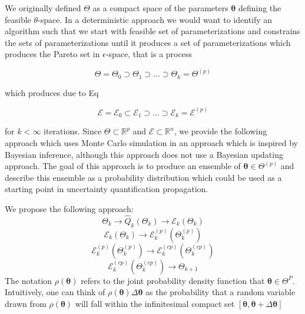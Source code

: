 We originally defined $\Theta$ as a compact space of the parameters ${\bm{\theta}}$ defining the feasible $\theta$-space.  In a deterministic approach we would want to identify an algorithm such that we start with feasible set of parameterizations and constrains the sets of parameterizations until it produces a set of parameterizations which produces the Pareto set in $\epsilon$-space, that is a process

\begin{equation}
    \Theta = \Theta_0 \supset \Theta_1 \supset \hdots \supset \Theta_k = \Theta^{(p)}
\end{equation}

which produces due to Eq %

\begin{equation}
    \mathcal{E} = \mathcal{E}_0 \subset \mathcal{E}_1 \supset \hdots \supset \mathcal{E}_k = \mathcal{E}^{(p)}
\end{equation}

for $k < \infty$ iterations.  Since $\Theta \subset \mathbb{R}^p$ and $\mathcal{E} \subset \mathbb{R}^n$, we provide the following approach which uses Monte Carlo simulation in an approach which is inspired by Bayesian inference, although this approach does not use a Bayesian updating approach.  The goal of this approach is to produce an ensemble of $\bm{\theta}\in \Theta^{(p)}$ and describe this ensemble as a probability distribution which could be used as a starting point in uncertainty quantification propagation.

We propose the following approach:
\begin{equation}
	\Theta_k \rightarrow \hat{Q}_k(\Theta_k) \rightarrow \mathcal{E}_k(\Theta_k)
\end{equation}
\begin{equation}
	\mathcal{E}_k(\Theta_k) \rightarrow \mathcal{E}_k^{(p)}(\Theta_k^{(p)})
\end{equation}
\begin{equation}
	\mathcal{E}_k^{(p)}(\Theta_k^{(p)}) \rightarrow \mathcal{E}_k^{(cp)}(\Theta_k^{(cp)})
\end{equation}
\begin{equation}
	      \mathcal{E}_k^{(cp)}(\Theta_k^{(cp)}) \rightarrow \Theta_{k+1}
\end{equation}
The notation $\rho(\bm{\theta})$ refers to the joint probability density function that $\bm{\theta} \in \Theta^{P}$.
Intuitively, one can think of
$\rho(\bm{\theta})\Delta\bm{\theta}$
as the probability that a random variable drawn from $\rho(\bm{\theta})$ will fall within the infinitesimal compact set $[\bm{\theta},\bm{\theta}+\Delta\bm{\theta}]$

